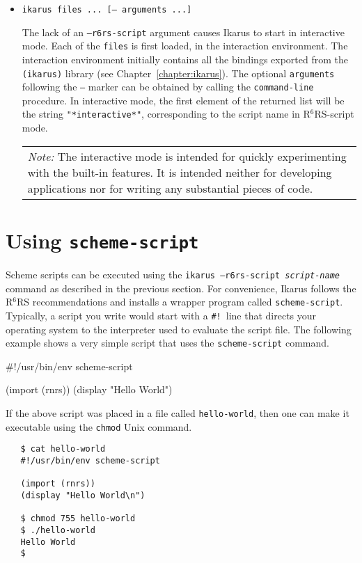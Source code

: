 \documentclass[onecolumn, 12pt, twoside, openright, dvipdfm]{book}
\newcommand{\rnrs}[1]{R$^{\mathrm{#1}}$RS}
\newcommand{\BoxedText}[2]{
  \vspace{.05in}
  \begin{center}
    \begin{tabular}{|p{4.6in}|} {\large \emph{#1}} #2 \end{tabular}
  \end{center}
  \vspace{.05in}
}
\begin{document}
\begin{itemize}
\item \texttt{ikarus files ... [-- arguments ...]}

The lack of an \texttt{--r6rs-script} argument causes Ikarus to
start in interactive mode.  Each of the \texttt{files} is first
loaded, in the interaction environment.  The interaction environment
initially contains all the bindings exported from the
\texttt{(ikarus)} library (see Chapter~\ref{chapter:ikarus}).  The
optional \texttt{arguments} following the \texttt{--} marker can be
obtained by calling the \texttt{command-line} procedure.  In
interactive mode, the first element of the returned list will be the
string \texttt{"*interactive*"}, corresponding to the script name in
\rnrs{6}-script mode.


\BoxedText{Note:}{The interactive mode is intended for quickly
experimenting with the built-in features.  It is intended neither
for developing applications nor for writing any substantial pieces
of code.}

\end{itemize}

\section{Using \texttt{scheme-script}}

Scheme scripts can be executed using the
\texttt{ikarus~--r6rs-script~\textit{script-name}} command as
described in the previous section.  For convenience, Ikarus
follows the \rnrs{6} recommendations and installs a wrapper program
called \texttt{scheme-script}.  Typically, a script you write would
start with a \texttt{\#!}\ line that directs your operating system
to the interpreter used to evaluate the script file.  The following
example shows a very simple script that uses the
\texttt{scheme-script} command.

\begin{CodeInline}
#!/usr/bin/env scheme-script

(import (rnrs))
(display "Hello World\n")
\end{CodeInline}

If the above script was placed in a file called
\texttt{hello-world}, then one can make it executable using the
\texttt{chmod} Unix command.

\begin{verbatim}
   $ cat hello-world
   #!/usr/bin/env scheme-script
   
   (import (rnrs))
   (display "Hello World\n")
   
   $ chmod 755 hello-world
   $ ./hello-world
   Hello World
   $
\end{verbatim}
\end{document}
